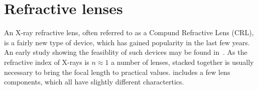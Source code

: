 \section{Refractive lenses}
\label{s:lenses}

An X-ray refractive lens, often referred to as a Compund Refractive Lens (CRL), is a fairly new type of device, which has gained popularity in
the last few years. An early study showing the feasiblity of such devices may be found in~\cite{snigirev1996}. As the refractive index of X-rays
is $n\approx1$ a number of lenses, stacked together is usually necessary to bring the focal length to practical values. 
\MCX includes a few lens components, which all have slightly different charactertics.

